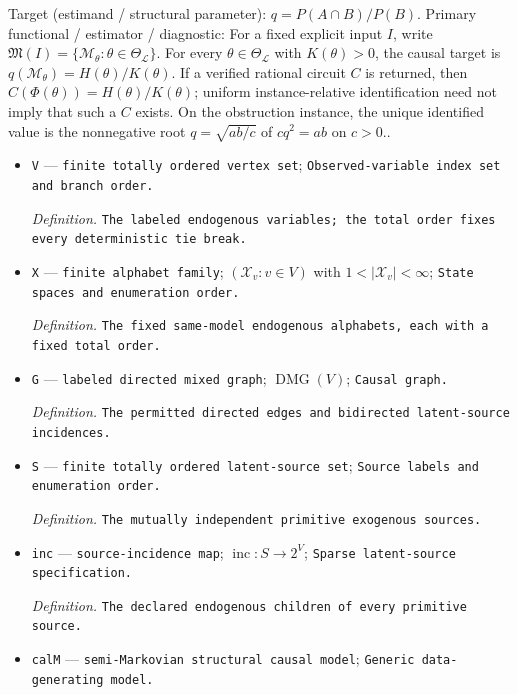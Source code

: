 \documentclass{article}
\begin{document}
Target (estimand / structural parameter): \(q=P(A\cap B)/P(B)\).
Primary functional / estimator / diagnostic: For a fixed explicit input \(I\), write \(\mathfrak M(I)=\{\mathcal M_\theta:\theta\in\Theta_{\mathcal L}\}\).  For every \(\theta\in\Theta_{\mathcal L}\) with \(K(\theta)>0\), the causal target is \(q(\mathcal M_\theta)=H(\theta)/K(\theta)\).  If a verified rational circuit \(C\) is returned, then \(C(\Phi(\theta))=H(\theta)/K(\theta)\); uniform instance-relative identification need not imply that such a \(C\) exists.  On the obstruction instance, the unique identified value is the nonnegative root \(q=\sqrt{ab/c}\) of \(cq^2=ab\) on \(c>0\)..
\begin{itemize}
  \item \texttt{V} --- \texttt{finite totally ordered vertex set}; \texttt{Observed-\allowbreak{}variable index set and branch order.}
  \par\smallskip\noindent\emph{Definition.} \texttt{The labeled endogenous variables;\allowbreak{} the total order fixes every deterministic tie break.}
  \item \texttt{X} --- \texttt{finite alphabet family}; \((\mathcal X_v:v\in V)\) with \(1<|\mathcal X_v|<\infty\); \texttt{State spaces and enumeration order.}
  \par\smallskip\noindent\emph{Definition.} \texttt{The fixed same-\allowbreak{}model endogenous alphabets,\allowbreak{} each with a fixed total order.}
  \item \texttt{G} --- \texttt{labeled directed mixed graph}; \(\operatorname{DMG}(V)\); \texttt{Causal graph.}
  \par\smallskip\noindent\emph{Definition.} \texttt{The permitted directed edges and bidirected latent-\allowbreak{}source incidences.}
  \item \texttt{S} --- \texttt{finite totally ordered latent-\allowbreak{}source set}; \texttt{Source labels and enumeration order.}
  \par\smallskip\noindent\emph{Definition.} \texttt{The mutually independent primitive exogenous sources.}
  \item \texttt{inc} --- \texttt{source-\allowbreak{}incidence map}; \(\operatorname{inc}:S\to2^V\); \texttt{Sparse latent-\allowbreak{}source specification.}
  \par\smallskip\noindent\emph{Definition.} \texttt{The declared endogenous children of every primitive source.}
  \item \texttt{calM} --- \texttt{semi-\allowbreak{}Markovian structural causal model}; \texttt{Generic data-\allowbreak{}generating model.}

\end{itemize}
\end{document}
